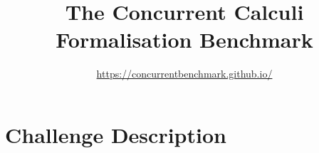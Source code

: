 \documentclass[runningheads]{llncs}
\begin{document}
\title{The Concurrent Calculi Formalisation Benchmark}
\author{\url{https://concurrentbenchmark.github.io/}}
\date{}
\institute{}


\maketitle

\section{Challenge Description}\label{app:challenges}




\end{document}
